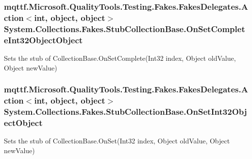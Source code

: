 \hypertarget{class_system_1_1_collections_1_1_fakes_1_1_stub_collection_base_a76bdbb8dbcc9f5c3f1e1c1833558be2b}{
\subsubsection[{On\-Set\-Complete\-Int32\-Object\-Object}]{\setlength{\rightskip}{0pt plus 5cm}mqttf.\-Microsoft.\-Quality\-Tools.\-Testing.\-Fakes.\-Fakes\-Delegates.\-Action$<$int, object, object$>$ System.\-Collections.\-Fakes.\-Stub\-Collection\-Base.\-On\-Set\-Complete\-Int32\-Object\-Object}}\label{class_system_1_1_collections_1_1_fakes_1_1_stub_collection_base_a76bdbb8dbcc9f5c3f1e1c1833558be2b}


Sets the stub of Collection\-Base.\-On\-Set\-Complete(\-Int32 index, Object old\-Value, Object new\-Value)

\hypertarget{class_system_1_1_collections_1_1_fakes_1_1_stub_collection_base_adc87040dc53c6208b0384bbf3d8296c6}{
\subsubsection[{On\-Set\-Int32\-Object\-Object}]{\setlength{\rightskip}{0pt plus 5cm}mqttf.\-Microsoft.\-Quality\-Tools.\-Testing.\-Fakes.\-Fakes\-Delegates.\-Action$<$int, object, object$>$ System.\-Collections.\-Fakes.\-Stub\-Collection\-Base.\-On\-Set\-Int32\-Object\-Object}}\label{class_system_1_1_collections_1_1_fakes_1_1_stub_collection_base_adc87040dc53c6208b0384bbf3d8296c6}


Sets the stub of Collection\-Base.\-On\-Set(\-Int32 index, Object old\-Value, Object new\-Value)

